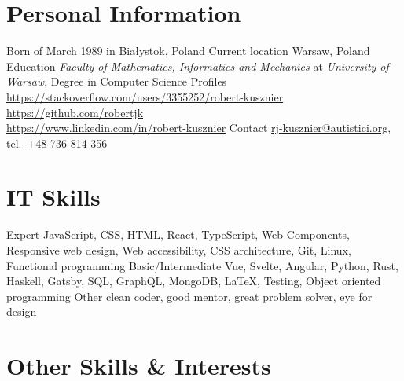 

\section{Personal Information}

\begin{sectionlist}
    \sectionlistitem
        {Born}
        { of March 1989 in Bia\l{}ystok, Poland}
    \sectionlistitem
        {Current location}
        {Warsaw, Poland}
    \sectionlistitem
        {Education}
        {
            \emph{Faculty of Mathematics, Informatics and Mechanics} at
            \emph{University of Warsaw}, Degree in Computer
            Science
        }
    \sectionlistitem
        {Profiles}
        {
            \url{https://stackoverflow.com/users/3355252/robert-kusznier} \\
            \url{https://github.com/robertjk} \\
            \url{https://www.linkedin.com/in/robert-kusznier}
        }
    \sectionlistitem
        {Contact}
        {
            \href{mailto:rj-kusznier@autistici.org}{rj-kusznier@autistici.org},
            tel.~+48 736 814 356
        }
\end{sectionlist}


\section{IT Skills}

\begin{sectionlist}
    \sectionlistitem
        {Expert}
        {
            JavaScript, CSS, HTML, React, TypeScript, Web Components, Responsive web
            design, Web accessibility, CSS architecture, Git, Linux, Functional
            programming
        }
    \sectionlistitem
        {Basic/Intermediate}
        {
            Vue, Svelte, Angular, Python, Rust, Haskell, Gatsby, SQL, GraphQL, MongoDB, \LaTeX,
            Testing, Object oriented programming
        }
    \sectionlistitem
        {Other}
        {clean coder, good mentor, great problem solver, eye for design}
\end{sectionlist}


\section{Other Skills \& Interests}

